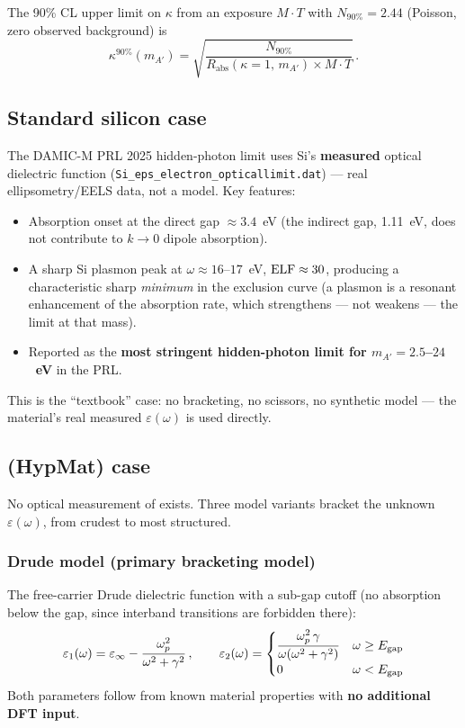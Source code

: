 The 90\% CL upper limit on $\kappa$ from an exposure $M\cdot T$ with
$N_{90\%} = 2.44$ (Poisson, zero observed background) is
\begin{equation}
\kappa^{90\%}(m_{A'}) = \sqrt{\dfrac{N_{90\%}}{R_\mathrm{abs}(\kappa=1,\,m_{A'})\times M\cdot T}}\,.
\end{equation}

\subsection{Standard silicon case}

The DAMIC-M PRL 2025 hidden-photon limit \citep{DAMICM2025} uses Si's
\textbf{measured} optical dielectric function
(\texttt{Si\_eps\_electron\_opticallimit.dat}) — real ellipsometry/EELS
data, not a model. Key features:
\begin{itemize}[leftmargin=*]
  \item Absorption onset at the direct gap $\approx 3.4$~eV (the indirect
        gap, 1.11~eV, does not contribute to $k\to0$ dipole absorption).
  \item A sharp Si plasmon peak at $\omega\approx16$--$17$~eV,
        $\mathrm{ELF}\approx30$, producing a characteristic sharp \emph{minimum} in
        the exclusion curve (a plasmon is a resonant enhancement of the
        absorption rate, which strengthens — not weakens — the limit at
        that mass).
  \item Reported as the \textbf{most stringent hidden-photon limit for
        $m_{A'}=2.5$--$24$~eV} in the PRL.
\end{itemize}
This is the ``textbook'' case: no bracketing, no scissors, no synthetic
model — the material's real measured $\varepsilon(\omega)$ is used
directly.

\subsection{\SrCdSb{} (HypMat) case}
\label{sec:darkphoton-hypmat}

No optical measurement of \SrCdSb{} exists. Three model variants bracket the
unknown $\varepsilon(\omega)$, from crudest to most structured.

\subsubsection{Drude model (primary bracketing model)}

The free-carrier Drude dielectric function with a sub-gap cutoff (no
absorption below the gap, since interband transitions are forbidden there):
\begin{equation}
\varepsilon_1(\omega) = \varepsilon_\infty - \frac{\omega_p^2}{\omega^2+\gamma^2}\,,
\qquad
\varepsilon_2(\omega) = \begin{cases}
\dfrac{\omega_p^2\,\gamma}{\omega(\omega^2+\gamma^2)} & \omega \geq E_\mathrm{gap} \\[4pt]
0 & \omega < E_\mathrm{gap}
\end{cases}
\end{equation}
Both parameters follow from known material properties with \textbf{no
additional DFT input}.

